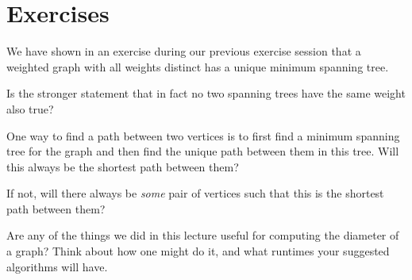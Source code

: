 \documentclass[nobib]{tufte-handout}
\begin{document}
\section{Exercises}

\begin{xca}
  We have shown in an exercise during our previous exercise session that a weighted graph with all weights distinct has a unique minimum spanning tree.

  Is the stronger statement that in fact no two spanning trees have the same weight also true?
\end{xca}

\begin{xca}
  One way to find a path between two vertices is to first find a minimum spanning tree for the graph and then find the unique path between them in this tree. Will this always be the shortest path between them?

  If not, will there always be \emph{some} pair of vertices such that this is the shortest path between them?
\end{xca}

\begin{xca}
  Are any of the things we did in this lecture useful for computing the diameter of a graph? Think about how one might do it, and what runtimes your suggested algorithms will have.
\end{xca}

%
%
\end{document}
